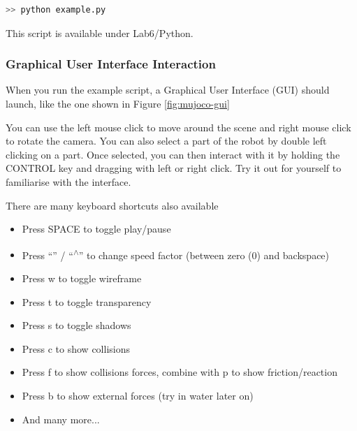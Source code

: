 \documentclass{cmc}
\begin{document}
\label{sec:mujoco-example}
\begin{lstlisting}[language=Bash]
  >> python example.py
\end{lstlisting}

This script is available under Lab6/Python.

\subsubsection*{Graphical User Interface Interaction}
When you run the example script, a Graphical User Interface (GUI) should launch,
like the one shown in Figure \ref{fig:mujoco-gui}

You can use the left mouse click to move around the scene and right mouse click
to rotate the camera. You can also select a part of the robot by double left
clicking on a part. Once selected, you can then interact with it by holding the
CONTROL key and dragging with left or right click. Try it out for yourself to
familiarise with the interface.

There are many keyboard shortcuts also available

\begin{itemize}
\item Press SPACE to toggle play/pause
\item Press ``\textquotesingle'' / ``\textsuperscript{$\wedge$}'' to change
  speed factor (between zero (0) and backspace)
\item Press w to toggle wireframe
\item Press t to toggle transparency
\item Press s to toggle shadows
\item Press c to show collisions
\item Press f to show collisions forces, combine with p to show
  friction/reaction
\item Press b to show external forces (try in water later on)
\item And many more...
\end{itemize}
\end{document}
